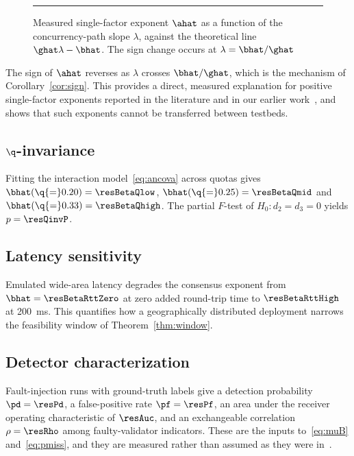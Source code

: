 \begin{figure}[!t]
\centering
\rule{0.75\textwidth}{0.22\textwidth}
\caption{Measured single-factor exponent $\ahat$ as a function of the
concurrency-path slope $\lambda$, against the theoretical line
$\ghat\lambda-\bhat$. The sign change occurs at $\lambda=\bhat/\ghat$}
\label{fig:confounding}
\end{figure}

The sign of $\ahat$ reverses as $\lambda$ crosses $\bhat/\ghat$, which is the
mechanism of Corollary~\ref{cor:sign}. This provides a direct, measured
explanation for positive single-factor exponents reported in the literature
and in our earlier work~\cite{peniak2026a}, and shows that such exponents
cannot be transferred between testbeds.

\subsection{$\q$-invariance}

Fitting the interaction model~\eqref{eq:ancova} across quotas gives
$\bhat(\q{=}0.20)=\resBetaQlow$, $\bhat(\q{=}0.25)=\resBetaQmid$ and
$\bhat(\q{=}0.33)=\resBetaQhigh$. The partial $F$-test of
$H_{0}:d_{2}=d_{3}=0$ yields $p=\resQinvP$. 

\subsection{Latency sensitivity}

Emulated wide-area latency degrades the consensus exponent from
$\bhat=\resBetaRttZero$ at zero added round-trip time to $\resBetaRttHigh$ at
200~ms. This quantifies how a geographically distributed deployment narrows the
feasibility window of Theorem~\ref{thm:window}.

\subsection{Detector characterization}

Fault-injection runs with ground-truth labels give a detection probability
$\pd=\resPd$, a false-positive rate $\pf=\resPf$, an area under the receiver
operating characteristic of $\resAuc$, and an exchangeable correlation
$\rho=\resRho$ among faulty-validator indicators. These are the inputs
to~\eqref{eq:muB} and~\eqref{eq:pmiss}, and they are measured rather than
assumed as they were in~\cite{peniak2026b}.

